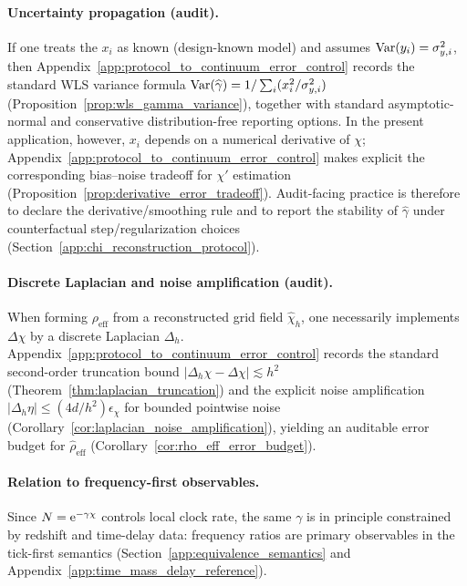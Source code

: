 \paragraph{Uncertainty propagation (audit).}
\AuditTag If one treats the $x_i$ as known (design-known model) and assumes $\mathrm{Var}(y_i)=\sigma_{y,i}^2$, then Appendix~\ref{app:protocol_to_continuum_error_control} records the standard WLS variance formula
$\mathrm{Var}(\widehat\gamma)=1/\sum_i (x_i^2/\sigma_{y,i}^2)$ (Proposition~\ref{prop:wls_gamma_variance}), together with standard asymptotic-normal and conservative distribution-free reporting options.
In the present application, however, $x_i$ depends on a numerical derivative of $\chi$; Appendix~\ref{app:protocol_to_continuum_error_control} makes explicit the corresponding bias--noise tradeoff for $\chi'$ estimation (Proposition~\ref{prop:derivative_error_tradeoff}).
Audit-facing practice is therefore to declare the derivative/smoothing rule and to report the stability of $\widehat\gamma$ under counterfactual step/regularization choices (Section~\ref{app:chi_reconstruction_protocol}).

\paragraph{Discrete Laplacian and noise amplification (audit).}
\AuditTag When forming $\rho_{\mathrm{eff}}$ from a reconstructed grid field $\widehat\chi_h$, one necessarily implements $\Delta\chi$ by a discrete Laplacian $\Delta_h$.
Appendix~\ref{app:protocol_to_continuum_error_control} records the standard second-order truncation bound $|\Delta_h\chi-\Delta\chi|\lesssim h^2$ (Theorem~\ref{thm:laplacian_truncation}) and the explicit noise amplification $|\Delta_h\eta|\le (4d/h^2)\epsilon_\chi$ for bounded pointwise noise (Corollary~\ref{cor:laplacian_noise_amplification}), yielding an auditable error budget for $\widehat\rho_{\mathrm{eff}}$ (Corollary~\ref{cor:rho_eff_error_budget}).

\paragraph{Relation to frequency-first observables.}
\InterfaceTag Since $N=\mathrm{e}^{-\gamma\chi}$ controls local clock rate, the same $\gamma$ is in principle constrained by redshift and time-delay data:
frequency ratios are primary observables in the tick-first semantics (Section~\ref{app:equivalence_semantics} and Appendix~\ref{app:time_mass_delay_reference}).


